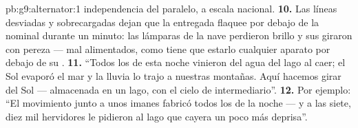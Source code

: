 \begin{solution}{pb:g9:alternator:1}
independencia del paralelo, a escala nacional.
\textbf{10.} Las líneas desviadas y sobrecargadas dejan que la
 entregada flaquee por debajo de la nominal durante un
minuto: las lámparas de la nave perdieron brillo y sus
 giraron con pereza --- mal alimentados, como tiene que
estarlo cualquier aparato por debajo de su .
\textbf{11.} ``Todos los  de esta noche vinieron del agua
del lago al caer; el Sol evaporó el mar y la lluvia lo trajo a nuestras
montañas. Aquí hacemos girar  del Sol --- almacenada en un lago, con
el cielo de intermediario''.
\textbf{12.} Por ejemplo: ``El movimiento junto a unos imanes
fabricó todos los  de la noche --- y a las siete, diez mil
hervidores le pidieron al lago que cayera un poco más deprisa''.
\end{solution}
